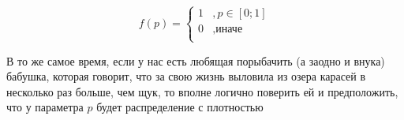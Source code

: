 \documentclass[12pt, a4paper, oneside]{article}
\begin{document}
\begin{figure}[H]
	\begin{minipage}[H]{0.39\linewidth}
		\begin{center}
			\[ f(p) = \begin{cases}
			1&, p \in [0;1] \\
			0&, \text{иначе}\\
			\end{cases} \]
		\end{center}
	\end{minipage}
	\hfill
	\begin{minipage}[H]{0.59\linewidth}
		\begin{center}
		\end{center}
	\end{minipage}
\end{figure}

В то же самое время, если у нас есть любящая порыбачить (а заодно и внука) бабушка, которая говорит, что за свою жизнь выловила из озера карасей в несколько раз больше, чем щук, то вполне логично поверить ей и предположить, что у параметра $p$ будет распределение с плотностью
\end{document}
